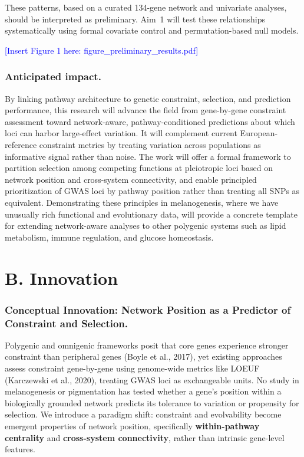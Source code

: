 \documentclass[11pt]{article}
\newcommand{\ednote}[1]{\textcolor{blue}{\textsf{[#1]}}}
\begin{document}
These patterns, based on a curated 134-gene network and univariate analyses, should be interpreted as preliminary. Aim~1 will test these relationships systematically using formal covariate control and permutation-based null models.

\ednote{Insert Figure 1 here: figure\_preliminary\_results.pdf}

\subsubsection{Anticipated impact.}
By linking pathway architecture to genetic constraint, selection, and prediction performance, this research will advance the field from gene-by-gene constraint assessment toward network-aware, pathway-conditioned predictions about which loci can harbor large-effect variation. It will complement current European-reference constraint metrics by treating variation across populations as informative signal rather than noise. The work will offer a formal framework to partition selection among competing functions at pleiotropic loci based on network position and cross-system connectivity, and enable principled prioritization of GWAS loci by pathway position rather than treating all SNPs as equivalent. Demonstrating these principles in melanogenesis, where we have unusually rich functional and evolutionary data, will provide a concrete template for extending network-aware analyses to other polygenic systems such as lipid metabolism, immune regulation, and glucose homeostasis.

\section{B. Innovation}

\subsubsection{Conceptual Innovation: Network Position as a Predictor of Constraint and Selection.}
Polygenic and omnigenic frameworks posit that core genes experience stronger constraint than peripheral genes (Boyle et al., 2017), yet existing approaches assess constraint gene-by-gene using genome-wide metrics like LOEUF (Karczewski et al., 2020), treating GWAS loci as exchangeable units. No study in melanogenesis or pigmentation has tested whether a gene's position within a biologically grounded network predicts its tolerance to variation or propensity for selection. We introduce a paradigm shift: constraint and evolvability become emergent properties of network position, specifically \textbf{within-pathway centrality} and \textbf{cross-system connectivity}, rather than intrinsic gene-level features.
\end{document}
